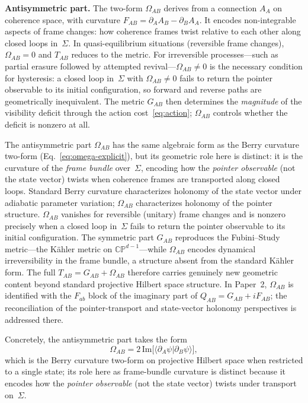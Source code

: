 \documentclass[aps,prd,twocolumn,superscriptaddress,nofootinbib,floatfix]{revtex4-2}
\newcommand{\Sig}{\Sigma}
\newcommand{\Tab}{T_{AB}}
\begin{document}
\textbf{Antisymmetric part.} The two-form $\Omega_{AB}$ derives from a connection $A_A$ on coherence space, with curvature $F_{AB} = \partial_A A_B - \partial_B A_A$. It encodes non-integrable aspects of frame changes: how coherence frames twist relative to each other along closed loops in~$\Sig$. In quasi-equilibrium situations (reversible frame changes), $\Omega_{AB} = 0$ and $\Tab$ reduces to the metric. For irreversible processes---such as partial erasure followed by attempted revival---$\Omega_{AB} \neq 0$ is the necessary condition for hysteresis: a closed loop in~$\Sig$ with $\Omega_{AB} \neq 0$ fails to return the pointer observable to its initial configuration, so forward and reverse paths are geometrically inequivalent. The metric $G_{AB}$ then determines the \emph{magnitude} of the visibility deficit through the action cost~\eqref{eq:action}; $\Omega_{AB}$ controls whether the deficit is nonzero at all.

The antisymmetric part $\Omega_{AB}$ has the same algebraic form as the Berry curvature two-form (Eq.~\eqref{eq:omega-explicit}), but its geometric role here is distinct: it is the curvature of the \emph{frame bundle} over~$\Sig$, encoding how the \emph{pointer observable} (not the state vector) twists when coherence frames are transported along closed loops. Standard Berry curvature characterizes holonomy of the state vector under adiabatic parameter variation; $\Omega_{AB}$ characterizes holonomy of the pointer structure. $\Omega_{AB}$ vanishes for reversible (unitary) frame changes and is nonzero precisely when a closed loop in~$\Sig$ fails to return the pointer observable to its initial configuration. The symmetric part $G_{AB}$ reproduces the Fubini--Study metric---the K\"ahler metric on $\mathbb{CP}^{d-1}$---while $\Omega_{AB}$ encodes dynamical irreversibility in the frame bundle, a structure absent from the standard K\"ahler form. The full $T_{AB} = G_{AB} + \Omega_{AB}$ therefore carries genuinely new geometric content beyond standard projective Hilbert space structure. In Paper~2, $\Omega_{AB}$ is identified with the $F_{ab}$ block of the imaginary part of $Q_{AB} = G_{AB} + iF_{AB}$; the reconciliation of the pointer-transport and state-vector holonomy perspectives is addressed there.

Concretely, the antisymmetric part takes the form
\begin{equation}\label{eq:omega-explicit}
  \Omega_{AB} = 2\,\mathrm{Im}\bigl[\langle\partial_A\psi|
  \partial_B\psi\rangle\bigr],
\end{equation}
which is the Berry curvature two-form on projective Hilbert space when restricted to a single state; its role here as frame-bundle curvature is distinct because it encodes how the \emph{pointer observable} (not the state vector) twists under transport on~$\Sig$.
\end{document}
